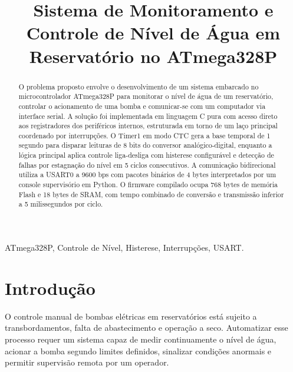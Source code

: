 \documentclass[conference]{IEEEtran}
\begin{document}
\title{Sistema de Monitoramento e Controle de Nível de Água em Reservatório no ATmega328P}

\author{
}

\maketitle

\begin{abstract}
	O problema proposto envolve o desenvolvimento de um sistema embarcado no microcontrolador ATmega328P para monitorar o nível de água de um reservatório, controlar o acionamento de uma bomba e comunicar-se com um computador via interface serial. A solução foi implementada em linguagem C pura com acesso direto aos registradores dos periféricos internos, estruturada em torno de um laço principal coordenado por interrupções. O Timer1 em modo CTC gera a base temporal de 1 segundo para disparar leituras de 8 bits do conversor analógico-digital, enquanto a lógica principal aplica controle liga-desliga com histerese configurável e detecção de falhas por estagnação do nível em 5 ciclos consecutivos. A comunicação bidirecional utiliza a USART0 a 9600 bps com pacotes binários de 4 bytes interpretados por um console supervisório em Python. O firmware compilado ocupa 768 bytes de memória Flash e 18 bytes de SRAM, com tempo combinado de conversão e transmissão inferior a 5 milissegundos por ciclo.
\end{abstract}

\begin{IEEEkeywords}
	ATmega328P, Controle de Nível, Histerese, Interrupções, USART.
\end{IEEEkeywords}

\section{Introdução}
O controle manual de bombas elétricas em reservatórios está sujeito a transbordamentos, falta de abastecimento e operação a seco. Automatizar esse processo requer um sistema capaz de medir continuamente o nível de água, acionar a bomba segundo limites definidos, sinalizar condições anormais e permitir supervisão remota por um operador.
\end{document}
